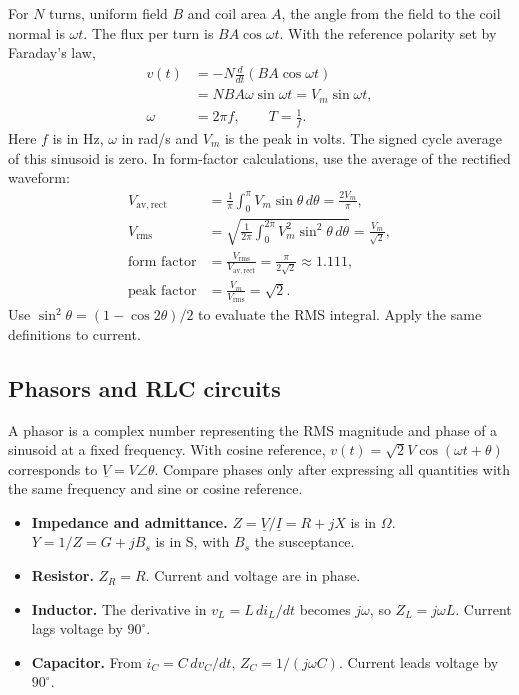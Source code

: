 \documentclass[12pt,a4paper]{article}
\begin{document}
For \(N\) turns, uniform field \(B\) and coil area \(A\), the angle from the field to the coil normal is \(\omega t\). The flux per turn is \(BA\cos\omega t\). With the reference polarity set by Faraday's law,
\[
\begin{aligned}
v(t)&=-N\frac{d}{dt}(BA\cos\omega t)\\
    &=NBA\omega\sin\omega t
     =V_m\sin\omega t,\\
\omega&=2\pi f,\qquad T=\frac{1}{f}.
\end{aligned}
\]
Here \(f\) is in Hz, \(\omega\) in rad/s and \(V_m\) is the peak in volts. The signed cycle average of this sinusoid is zero. In form-factor calculations, use the average of the rectified waveform:
\[
\begin{aligned}
V_{\mathrm{av,rect}}
 &=\frac{1}{\pi}\int_0^\pi V_m\sin\theta\,d\theta
 =\frac{2V_m}{\pi},\\
V_{\mathrm{rms}}
 &=\sqrt{\frac{1}{2\pi}\int_0^{2\pi}V_m^2\sin^2\theta\,d\theta}
 =\frac{V_m}{\sqrt2},\\
\text{form factor}
 &=\frac{V_{\mathrm{rms}}}{V_{\mathrm{av,rect}}}=\frac{\pi}{2\sqrt2}\approx1.111,\\
\text{peak factor}
 &=\frac{V_m}{V_{\mathrm{rms}}}=\sqrt2.
\end{aligned}
\]
Use \(\sin^2\theta=(1-\cos2\theta)/2\) to evaluate the RMS integral. Apply the same definitions to current.

\subsection{Phasors and RLC circuits}
A phasor is a complex number representing the RMS magnitude and phase of a sinusoid at a fixed frequency. With cosine reference, \(v(t)=\sqrt2 V\cos(\omega t+\theta)\) corresponds to \(\underline V=V\angle\theta\). Compare phases only after expressing all quantities with the same frequency and sine or cosine reference.

\begin{itemize}[leftmargin=*, itemsep=3pt, topsep=4pt]
  \item \textbf{Impedance and admittance.} \(Z=\underline V/\underline I=R+jX\) is in \(\Omega\). \(Y=1/Z=G+jB_s\) is in S, with \(B_s\) the susceptance.
  \item \textbf{Resistor.} \(Z_R=R\). Current and voltage are in phase.
  \item \textbf{Inductor.} The derivative in \(v_L=L\,di_L/dt\) becomes \(j\omega\), so \(Z_L=j\omega L\). Current lags voltage by \(90^\circ\).
  \item \textbf{Capacitor.} From \(i_C=C\,dv_C/dt\), \(Z_C=1/(j\omega C)\). Current leads voltage by \(90^\circ\).
\end{itemize}
\end{document}
